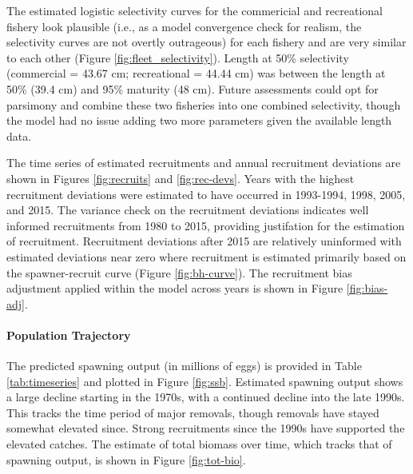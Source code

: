 \documentclass[11pt,
  english,
  a4paper,
]{article}
\begin{document}
\leavevmode\tagmcend\tagstructend\par


The estimated logistic selectivity curves for the commericial and recreational fishery look plausible (i.e., as a model convergence check for realism, the selectivity curves are not overtly outrageous) for each fishery and are very similar to each other (Figure \ref{fig:fleet_selectivity}). Length at 50\% selectivity (commercial = 43.67 cm; recreational = 44.44 cm) was between the length at 50\% (39.4 cm) and 95\% maturity (48 cm). Future assessments could opt for parsimony and combine these two fisheries into one combined selectivity, though the model had no issue adding two more parameters given the available length data.

\leavevmode\tagmcend\tagstructend\par


The time series of estimated recruitments and annual recruitment deviations are shown in Figures \ref{fig:recruits} and \ref{fig:rec-devs}. Years with the highest recruitment deviations were estimated to have occurred in 1993-1994, 1998, 2005, and 2015. The variance check on the recruitment deviations indicates well informed recruitments from 1980 to 2015, providing justifation for the estimation of recruitment. Recruitment deviations after 2015 are relatively uninformed with estimated deviations near zero where recruitment is estimated primarily based on the spawner-recruit curve (Figure \ref{fig:bh-curve}). The recruitment bias adjustment applied within the model across years is shown in Figure \ref{fig:bias-adj}.

\leavevmode\tagmcend\tagstructend\par


\hypertarget{population-trajectory}{%
\paragraph{Population Trajectory}\label{population-trajectory}}

\leavevmode\tagmcend\tagstructend


The predicted spawning output (in millions of eggs) is provided in Table \ref{tab:timeseries} and plotted in Figure \ref{fig:ssb}. Estimated spawning output shows a large decline starting in the 1970s, with a continued decline into the late 1990s. This tracks the time period of major removals, though removals have stayed somewhat elevated since. Strong recruitments since the 1990s have supported the elevated catches. The estimate of total biomass over time, which tracks that of spawning output, is shown in Figure \ref{fig:tot-bio}.
\end{document}
